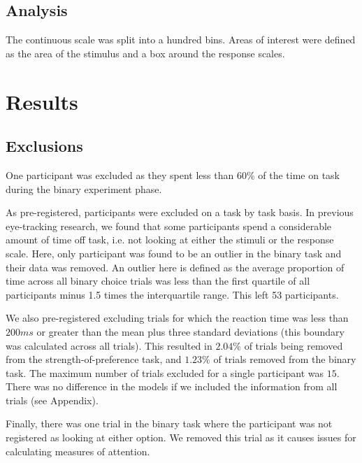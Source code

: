 \documentclass[12pt]{article}
\begin{document}
\subsection{Analysis}
The continuous scale was split into a hundred bins. Areas of interest were defined as the area of the stimulus and a box around the response scales. 

\section{Results}

\subsection{Exclusions}
One participant was excluded as they spent less than 60\% of the time on task during the binary experiment phase. 

As pre-registered, participants were excluded on a task by task basis. In previous eye-tracking research, we found that some participants spend a considerable amount of time off task, i.e. not looking at either the stimuli or the response scale. Here, only participant was found to be an outlier in the binary task and their data was removed. An outlier here is defined as the average proportion of time across all binary choice trials was less than the first quartile of all participants minus 1.5 times the interquartile range. This left 53 participants. 

We also pre-registered excluding trials for which the reaction time was less than $200ms$ or greater than the mean plus three standard deviations (this boundary was calculated across all trials). This resulted in $2.04\%$ of trials being removed from the strength-of-preference task, and $1.23\%$ of trials removed from the binary task. The maximum number of trials excluded for a single participant was $15$. There was no difference in the models if we included the information from all trials (see Appendix). 

Finally, there was one trial in the binary task where the participant was not registered as looking at either option. We removed this trial as it causes issues for calculating measures of attention. 
\end{document}
